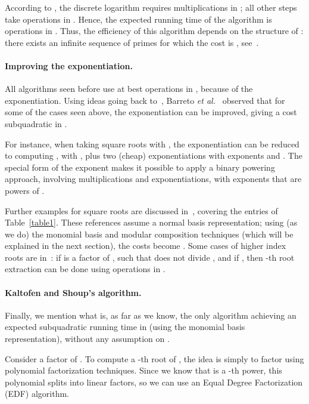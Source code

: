 \documentclass[12pt]{article}
\theoremstyle{plain}
\theoremstyle{definition}
\newcounter{algorithm}
\begin{document}
According to \cite{Pohlig1978}, the discrete logarithm requires
 multiplications in ; all other steps take
 operations in . Hence, the expected running
time of the algorithm is  operations in
. Thus, the efficiency of this algorithm depends on the
structure of : there exists an infinite sequence of primes for
which the cost is , see~\cite{Tornaria2002}.



\paragraph{Improving the exponentiation.}
All algorithms seen before use at best  operations
in , because of the exponentiation. Using ideas going back
to~\cite{ItTs88}, Barreto {\it et al.}~\cite{BaKiLySc02} observed that
for some of the cases seen above, the exponentiation can be improved,
giving a cost subquadratic in .

For instance, when taking square roots with , the
exponentiation  can be reduced to computing
, with , plus two (cheap)
exponentiations with exponents  and . The special
form of the exponent  makes it possible to
apply a binary powering approach, involving 
multiplications and exponentiations, with exponents that are powers of
.

Further examples for square roots are discussed
in~\cite{KoCaYuLi06,HaChKi09}, covering the entries of
Table~\ref{table1}. These references assume a normal basis
representation; using (as we do) the monomial basis and modular
composition techniques (which will be explained in the next section),
the costs become . Some cases of higher
index roots are in~\cite{BaVo06}: if  is a factor of , such
that  does not divide , and if , then -th
root extraction can be done using 
operations in .

\paragraph{Kaltofen and Shoup's algorithm.}
Finally, we mention what is, as far as we know, the only algorithm
achieving an expected subquadratic running time in  (using the
monomial basis representation), without any assumption on .

Consider a factor  of . To compute a -th root of
, the idea is simply to factor 
using polynomial factorization techniques. Since we know that  is a
-th power, this polynomial splits into linear factors, so we
can use an Equal Degree Factorization (EDF) algorithm.
\end{document}
